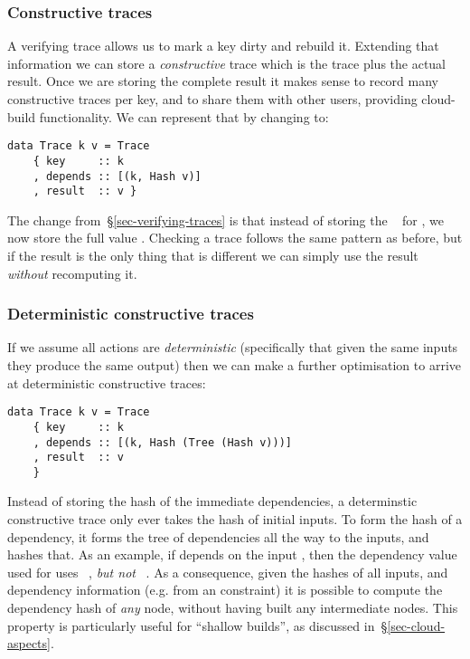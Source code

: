 \subsubsection{Constructive traces}\label{sec-constructive-traces}

A verifying trace allows us to mark a key dirty and rebuild it. Extending that information we can store a \emph{constructive} trace which is the trace plus the actual result. Once we are storing the complete result it makes sense to record many constructive traces per key, and to share them with other users, providing cloud-build functionality. We can represent that by changing  to:

\begin{verbatim}
data Trace k v = Trace
    { key     :: k
    , depends :: [(k, Hash v)]
    , result  :: v }
\end{verbatim}

The change from~\S\ref{sec-verifying-traces} is that instead of storing the ~ for , we now store the full value . Checking a trace follows the same pattern as before, but if the result is the only thing that is different we can simply use the result \emph{without} recomputing it.

\subsubsection{Deterministic constructive traces}\label{sec-deterministic-constructive-traces}

If we assume all actions are \emph{deterministic} (specifically that given the same inputs they produce the same output) then we can make a further optimisation to arrive at deterministic constructive traces:

\begin{verbatim}
data Trace k v = Trace
    { key     :: k
    , depends :: [(k, Hash (Tree (Hash v)))]
    , result  :: v
    }
\end{verbatim}

Instead of storing the hash of the immediate dependencies, a determinstic constructive trace only ever takes the hash of initial inputs. To form the hash of a dependency, it forms the tree of dependencies all the way to the inputs, and hashes that. As an example, if  depends on the input , then the dependency value used for  uses ~, \emph{but not} ~. As a consequence, given the hashes of all inputs, and dependency information (e.g. from an  constraint) it is possible to compute the dependency hash of \emph{any} node, without having built any intermediate nodes. This property is particularly useful for ``shallow builds'', as discussed in~\S\ref{sec-cloud-aspects}.

